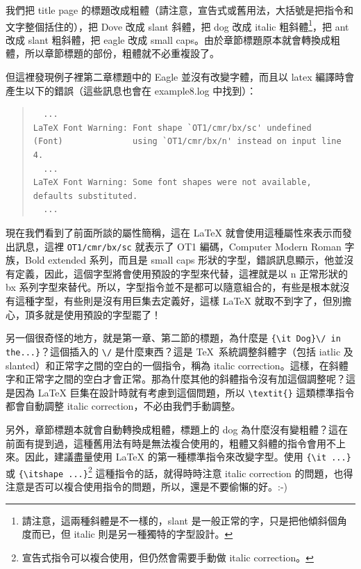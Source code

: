 我們把 title page 的標題改成粗體（請注意，宣告式或舊用法，大括號是把指令和文字整個括住的），把 Dove 改成 slant 斜體，把 dog 改成 italic 粗斜體\footnote{請注意，這兩種斜體是不一樣的，slant 是一般正常的字，只是把他傾斜個角度而已，但 italic 則是另一種獨特的字型設計。}，把 ant 改成 slant 粗斜體，把 eagle 改成 small caps。由於章節標題原本就會轉換成粗體，所以章節標題的部份，粗體就不必重複設了。

但這裡發現例子裡第二章標題中的 Eagle 並沒有改變字體，而且以 {\ttfamily latex} 編譯時會產生以下的錯誤（這些訊息也會在 {\ttfamily example8.log} 中找到）：

\begin{quote}
   \begin{verbatim}
  ...
LaTeX Font Warning: Font shape `OT1/cmr/bx/sc' undefined
(Font)              using `OT1/cmr/bx/n' instead on input line 4.
  ...
LaTeX Font Warning: Some font shapes were not available, defaults substituted.
  ...
\end{verbatim}
\end{quote}

現在我們看到了前面所談的屬性簡稱，這在 \LaTeX{} 就會使用這種屬性來表示而發出訊息，這裡 \verb|OT1/cmr/bx/sc| 就表示了 OT1 編碼，Computer Modern Roman 字族，Bold extended 系列，而且是 small caps 形狀的字型，錯誤訊息顯示，他並沒有定義，因此，這個字型將會使用預設的字型來代替，這裡就是以 n 正常形狀的 bx 系列字型來替代。所以，字型指令並不是都可以隨意組合的，有些是根本就沒有這種字型，有些則是沒有用巨集去定義好，這樣 \LaTeX{} 就取不到字了，但別擔心，頂多就是使用預設的字型罷了！

另一個很奇怪的地方，就是第一章、第二節的標題，為什麼是 \verb|{\it Dog}\/ in the...}|？這個插入的 \verb|\/| 是什麼東西？這是 \TeX\ 系統調整斜體字（包括 iatlic 及 slanted）和正常字之間的空白的一個指令，稱為 italic correction。這樣，在斜體字和正常字之間的空白才會正常。那為什麼其他的斜體指令沒有加這個調整呢？這是因為 \LaTeX{} 巨集在設計時就有考慮到這個問題，所以 \verb|\textit{}| 這類標準指令都會自動調整 italic correction，不必由我們手動調整。

另外，章節標題本就會自動轉換成粗體，標題上的 dog 為什麼沒有變粗體？這在前面有提到過，這種舊用法有時是無法複合使用的，粗體又斜體的指令會用不上來。因此，建議盡量使用 \LaTeX{} 的第一種標準指令來改變字型。使用 \verb|{\it ...}| 或 \verb|{\itshape ...}|\footnote{宣告式指令可以複合使用，但仍然會需要手動做 italic correction。} 這種指令的話，就得時時注意 italic correction 的問題，也得注意是否可以複合使用指令的問題，所以，還是不要偷懶的好。:-)

